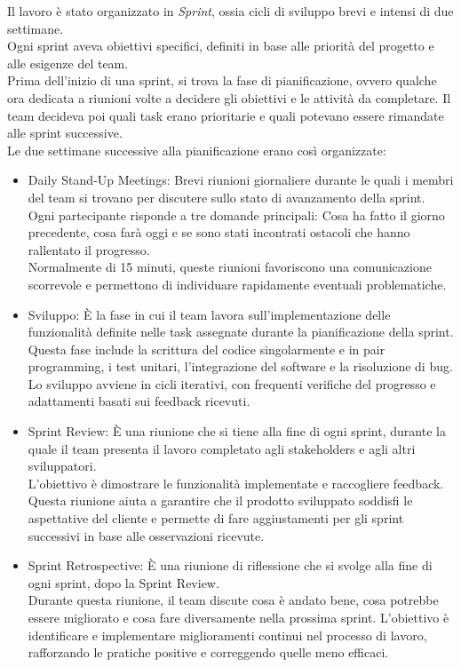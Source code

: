 Il lavoro è stato organizzato in \textit{Sprint}, ossia cicli di sviluppo brevi
e intensi di due settimane.\\ Ogni sprint aveva obiettivi specifici, definiti in
base alle priorità del progetto e alle esigenze del team.\\ Prima dell'inizio di
una sprint, si trova la fase di pianificazione, ovvero qualche ora dedicata a riunioni
volte a decidere gli obiettivi e le attività da completare. Il team decideva poi
quali task erano prioritarie e quali potevano essere rimandate alle sprint
successive.\\ Le due settimane successive alla pianificazione erano così
organizzate:
\begin{itemize}
  \item Daily Stand-Up Meetings: Brevi riunioni giornaliere durante le quali i
    membri del team si trovano per discutere sullo stato di avanzamento della
    sprint.\\ Ogni partecipante risponde a tre domande principali: Cosa ha fatto
    il giorno precedente, cosa farà oggi e se sono stati incontrati ostacoli che
    hanno rallentato il progresso.\\ Normalmente di 15 minuti, queste riunioni favoriscono
    una comunicazione scorrevole e permettono di individuare rapidamente eventuali
    problematiche.

  \item Sviluppo: È la fase in cui il team lavora sull'implementazione delle
    funzionalità definite nelle task assegnate durante la pianificazione della
    sprint.\\ Questa fase include la scrittura del codice singolarmente e in
    pair programming, i test unitari, l'integrazione del software e la
    risoluzione di bug.\\ Lo sviluppo avviene in cicli iterativi, con frequenti verifiche
    del progresso e adattamenti basati sui feedback ricevuti.

  \item Sprint Review: È una riunione che si tiene alla fine di ogni sprint, durante
    la quale il team presenta il lavoro completato agli stakeholders e agli altri
    sviluppatori.\\ L'obiettivo è dimostrare le funzionalità implementate e raccogliere
    feedback.\\ Questa riunione aiuta a garantire che il prodotto sviluppato soddisfi
    le aspettative del cliente e permette di fare aggiustamenti per gli sprint successivi
    in base alle osservazioni ricevute.

  \item Sprint Retrospective: È una riunione di riflessione che si svolge alla
    fine di ogni sprint, dopo la Sprint Review.\\ Durante questa riunione, il
    team discute cosa è andato bene, cosa potrebbe essere migliorato e cosa fare
    diversamente nella prossima sprint. L'obiettivo è identificare e
    implementare miglioramenti continui nel processo di lavoro, rafforzando le pratiche
    positive e correggendo quelle meno efficaci.
\end{itemize}

